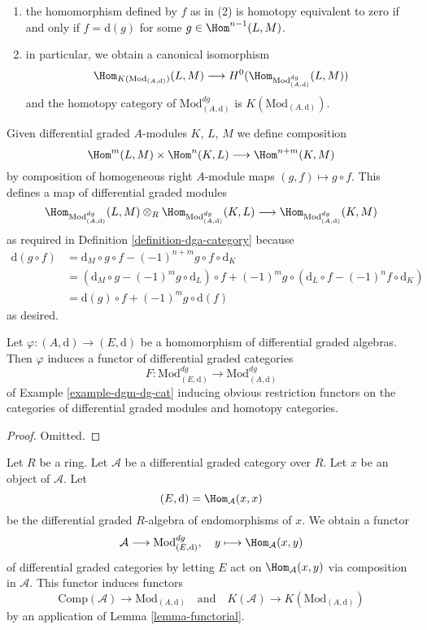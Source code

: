 \begin{example}
\begin{enumerate}
\item the homomorphism defined by $f$ as in (2) is homotopy equivalent
to zero if and only if $f = \text{d}(g)$ for some
$g \in \Hom^{n - 1}(L, M)$.
\item in particular, we obtain a canonical isomorphism
$$
\Hom_{K(\text{Mod}_{(A, \text{d})})}(L, M)
\longrightarrow
H^0(\Hom_{\text{Mod}^{dg}_{(A, \text{d})}}(L, M))
$$
and the homotopy category of $\text{Mod}^{dg}_{(A, \text{d})}$ is
$K(\text{Mod}_{(A, \text{d})})$.
\end{enumerate}
Given differential graded $A$-modules $K$, $L$, $M$ we define
composition
$$
\Hom^m(L, M) \times \Hom^n(K, L) \longrightarrow \Hom^{n + m}(K, M)
$$
by composition of homogeneous right $A$-module maps $(g, f) \mapsto g \circ f$.
This defines a map of differential graded modules
$$
\Hom_{\text{Mod}^{dg}_{(A, \text{d})}}(L, M) \otimes_R
\Hom_{\text{Mod}^{dg}_{(A, \text{d})}}(K, L) \longrightarrow
\Hom_{\text{Mod}^{dg}_{(A, \text{d})}}(K, M)
$$
as required in
Definition \ref{definition-dga-category}
because
\begin{align*}
\text{d}(g \circ f) & =
\text{d}_M \circ g \circ f - (-1)^{n + m} g \circ f \circ \text{d}_K \\
& =
\left(\text{d}_M \circ g - (-1)^m g \circ \text{d}_L\right) \circ f +
(-1)^m g \circ \left(\text{d}_L \circ f - (-1)^n f \circ \text{d}_K\right) \\
& =
\text{d}(g) \circ f + (-1)^m g \circ \text{d}(f)
\end{align*}
as desired.
\end{example}

\begin{lemma}
\label{lemma-homomorphism-induces-dga-functor}
Let $\varphi : (A, \text{d}) \to (E, \text{d})$ be a homomorphism of
differential graded algebras. Then $\varphi$ induces a functor of differential
graded categories
$$
F :
\text{Mod}^{dg}_{(E, \text{d})}
\longrightarrow
\text{Mod}^{dg}_{(A, \text{d})}
$$
of Example \ref{example-dgm-dg-cat} inducing obvious restriction functors
on the categories of differential graded modules and homotopy categories.
\end{lemma}

\begin{proof}
Omitted.
\end{proof}

\begin{lemma}
\label{lemma-construction}
Let $R$ be a ring. Let $\mathcal{A}$ be a differential graded category
over $R$. Let $x$ be an object of $\mathcal{A}$. Let
$$
(E, \text{d}) = \Hom_\mathcal{A}(x, x)
$$
be the differential graded $R$-algebra of endomorphisms of $x$.
We obtain a functor
$$
\mathcal{A} \longrightarrow \text{Mod}^{dg}_{(E, \text{d})},\quad
y \longmapsto \Hom_\mathcal{A}(x, y)
$$
of differential graded categories by letting $E$ act on
$\Hom_\mathcal{A}(x, y)$ via composition in $\mathcal{A}$.
This functor induces functors
$$
\text{Comp}(\mathcal{A}) \to \text{Mod}_{(A, \text{d})}
\quad\text{and}\quad
K(\mathcal{A}) \to K(\text{Mod}_{(A, \text{d})})
$$
by an application of Lemma \ref{lemma-functorial}.
\end{lemma}

